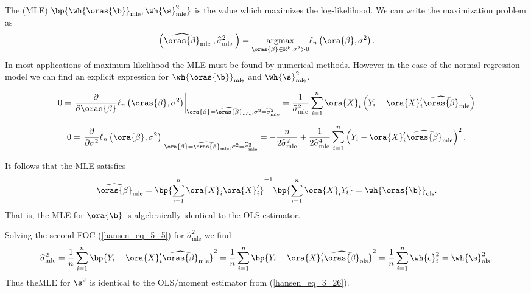 The  (MLE) $\bp{\wh{\oras{\b}}_{\text{mle}}, \wh{\s}^2_{\text{mle}}}$ is the value which maximizes the log-likelihood. We can write the maximization problem as 
\begin{equation}
    \label{hansen_eq_5_3}
    \left(\widehat{\oras{\beta}}_{\text {mle }}, \widehat{\sigma}_{\text {mle }}^2\right)=\underset{\oras{\beta} \in \mathbb{R}^k, \sigma^2>0}{\operatorname{argmax}} \ell_n\left(\ora{\beta}, \sigma^2\right) .
\end{equation}
In most applications of maximum likelihood the MLE must be found by numerical methods. However in the case of the normal regression model we can find an explicit expression for $\wh{\oras{\b}}_{\text{mle}}$ and $\wh{\s}^2_{\text{mle}}$.

\begin{equation}
    \label{hansen_eq_5_4}
    0 = \left. \frac{\partial}{\partial \oras{\beta}} \ell_n\left(\oras{\beta}, \sigma^2\right) \right\vert _{\ora{\beta}=\widehat{\oras{\beta}}_{\text{mle}}, \sigma^2=\widehat{\sigma}_{\text{mle}}^2}=\frac{1}{\widehat{\sigma}_{\text{mle}}^2} \sum_{i=1}^n \ora{X}_i\left(Y_i-\ora{X}_i^{\prime} \widehat{\oras{\beta}}_{\text{mle}}\right)
\end{equation}

\begin{equation}
    \label{hansen_eq_5_5}
    0 = \left. \frac{\partial}{\partial \sigma^2} \ell_n\left(\ora{\beta}, \sigma^2\right) \right\vert _{\ora{\beta}=\widehat{\oras{\beta}}_{\text{mle}}, \sigma^2=\widehat{\sigma}_{\text{mle}}^2}=-\frac{n}{2 \widehat{\sigma}_{\text{mle}}^2}+\frac{1}{2 \widehat{\sigma}_{\text{mle}}^4} \sum_{i=1}^n\left(Y_i-\ora{X}_i^{\prime} \widehat{\oras{\beta}}_{\text{mle}}\right)^2 .
\end{equation}

It follows that the MLE satisfies 
\begin{equation}
    \notag
    \widehat{\oras{\beta}}_{\text{mle}} = \bp{\sum_{i=1}^{n} \ora{X}_i \ora{X}_i^\prime}^{-1} \bp{\sum_{i=1}^{n} \ora{X}_i Y_i} = \wh{\oras{\b}}_{\text{ols}}.
\end{equation}
That is, the MLE for $\ora{\b}$ is algebraically identical to the OLS estimator.

Solving the second FOC (\ref{hansen_eq_5_5}) for $\widehat{\sigma}_{\text{mle}}^2$ we find 
\begin{equation}
    \notag
    \widehat{\sigma}_{\text{mle}}^2 = \frac{1}{n} \sum_{i=1}^{n} \bp{Y_i - \ora{X}_i^\prime \widehat{\oras{\beta}}_{\text{mle}}}^2 = \frac{1}{n} \sum_{i=1}^{n} \bp{Y_i - \ora{X}_i^\prime \widehat{\oras{\beta}}_{\text{ols}}}^2 = \frac{1}{n} \sum_{i=1}^{n} \wh{e}_i^2 = \wh{\s}^2_{\text{ols}}.
\end{equation}
Thus theMLE for $\s^2$ is identical to the OLS/moment estimator from (\ref{hansen_eq_3_26}).

